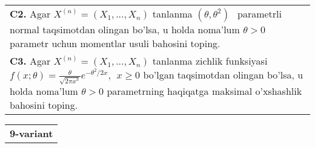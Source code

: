 \documentclass{article}
\begin{document}
\begin{tabular}{m{17cm}}
\\
\textbf{C2.} 
Agar \(X^{(n)} = \left( X_{1},...,X_{n} \right)\) tanlanma \((\theta,\theta^{2})\ \ \) parametrli normal taqsimotdan olingan bo'lsa, u holda noma'lum \(\theta > 0\) parametr uchun momentlar usuli bahosini toping.
\\
\textbf{C3.} 
Agar \(X^{(n)} = \left( X_{1},...,X_{n} \right)\) tanlanma zichlik funksiyasi \(f(x;\theta) = \frac{\theta}{\sqrt{2\pi x^{3}}}e^{- \theta^{2}/2x},\ \ x \geq 0\) bo'lgan taqsimotdan olingan bo'lsa, u holda noma'lum \(\theta > 0\) parametrning haqiqatga maksimal o'xshashlik bahosini toping.
\\

\end{tabular}
\vspace{1cm}


\begin{tabular}{m{17cm}}
\textbf{9-variant}
\newline


\end{tabular}
\end{document}
